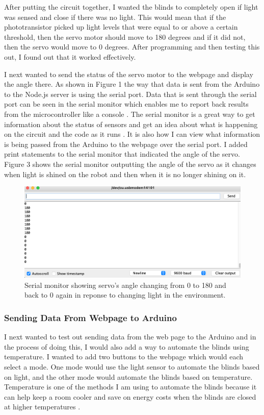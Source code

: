 \documentclass[10pt,twocolumn]{article}
\begin{document}
After putting the circuit together, I wanted the blinds to completely open if light was sensed and close if there was no light. This would mean that if the phototransistor picked up light levels that were equal to or above a certain threshold, then the servo motor should move to 180 degrees and if it did not, then the servo would move to 0 degrees. After programming and then testing this out, I found out that it worked effectively. 

I next wanted to send the status of the servo motor to the webpage and display the angle there. As shown in Figure 1 the way that data is sent from the Arduino to the Node.js server is using the serial port. Data that is sent through the serial port can be seen in the serial monitor which enables me to report back results from the microcontroller like a console \cite{Fiztgerald2015Arduino}. The serial monitor is a great way to get information about the status of sensors and get an idea about what is happening on the circuit and the code as it runs \cite{Fiztgerald2015Arduino}. It is also how I can view what information is being passed from the Arduino to the webpage over the serial port. I added print statements to the serial monitor that indicated the angle of the servo. Figure 3 shows the serial monitor outputting the angle of the servo as it changes when light is shined on the robot and then when it is no longer shining on it. 

\begin{figure}
    \centering
    \includegraphics[width=.95\linewidth]{Figure 3.png}
    \caption{
        Serial monitor showing servo's angle changing from 0 to 180 and back to 0 again in reponse to changing light in the environment.
    }
    \label{fig:fig3}
\end{figure}

\subsubsection*{Sending Data From Webpage to Arduino}
I next wanted to test out sending data from the web page to the Arduino and in the process of doing this, I would also add a way to automate the blinds using temperature. I wanted to add two buttons to the webpage which would each select a mode. One mode would use the light sensor to automate the blinds based on light, and the other mode would automate the blinds based on temperature. Temperature is one of the methods I am using to automate the blinds because it can help keep a room cooler and save on energy costs when the blinds are closed at higher temperatures \cite{Jang2014ToStayCool}.
\end{document}
